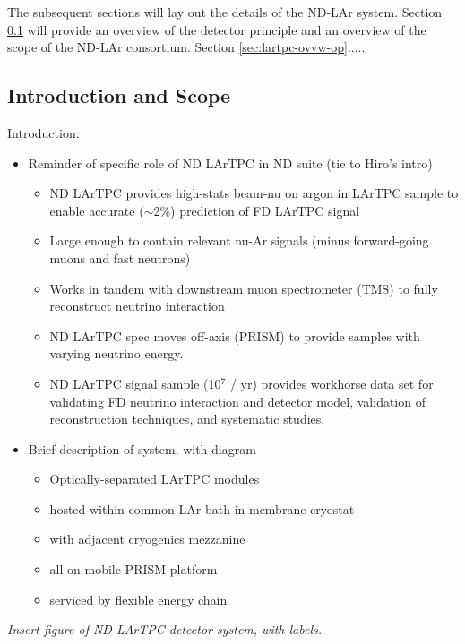 The subsequent sections will lay out the details of the ND-LAr system. Section \ref{sec:lartpc-ovvw-intro} will provide an overview of the detector principle and an overview of the scope of the ND-LAr consortium. Section \ref{sec:lartpc-ovvw-op}.....



\subsection{Introduction and Scope}
\label{sec:lartpc-ovvw-intro}




Introduction:
\begin{itemize}
\item Reminder of specific role of ND LArTPC in ND suite (tie to Hiro's intro)
    \begin{itemize}
        \item ND LArTPC provides high-stats beam-nu on argon in LArTPC sample to enable accurate ($\sim$2\%) prediction of FD LArTPC signal
        \item Large enough to contain relevant nu-Ar signals (minus forward-going muons and fast neutrons)
        \item Works in tandem with downstream muon spectrometer (TMS) to fully reconstruct neutrino interaction
        \item ND LArTPC spec moves off-axis (PRISM) to provide samples with varying neutrino energy.
        \item ND LArTPC signal sample (10$^7$ / yr) provides workhorse data set for validating FD neutrino interaction and detector model, validation of reconstruction techniques, and systematic studies.
    \end{itemize}
\item Brief description of system, with diagram
    \begin{itemize}
        \item Optically-separated LArTPC modules
        \item hosted within common LAr bath in membrane cryostat
        \item with adjacent cryogenics mezzanine
        \item all on mobile PRISM platform
        \item serviced by flexible energy chain
    \end{itemize}
\end{itemize}

{\it Insert figure of ND LArTPC detector system, with labels.}

